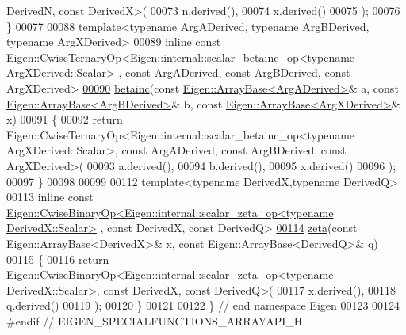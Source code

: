 \begin{DoxyCode}
      DerivedN, \textcolor{keyword}{const} DerivedX>(
00073     n.derived(),
00074     x.derived()
00075   );
00076 \}
00077 
00088 \textcolor{keyword}{template}<\textcolor{keyword}{typename} ArgADerived, \textcolor{keyword}{typename} ArgBDerived, \textcolor{keyword}{typename} ArgXDerived>
00089 \textcolor{keyword}{inline} \textcolor{keyword}{const} 
      \hyperlink{group___core___module_class_eigen_1_1_cwise_ternary_op}{Eigen::CwiseTernaryOp<Eigen::internal::scalar\_betainc\_op<typename ArgXDerived::Scalar>}
      , \textcolor{keyword}{const} ArgADerived, \textcolor{keyword}{const} ArgBDerived, \textcolor{keyword}{const} ArgXDerived>
\hyperlink{namespace_eigen_a81f796c95561b9847eb8a6b8ccfa3e7d}{00090} \hyperlink{namespace_eigen_a726eae91d4e91d8e25cbe55fffa6a92f}{betainc}(\textcolor{keyword}{const} \hyperlink{group___core___module_class_eigen_1_1_array_base}{Eigen::ArrayBase<ArgADerived>}& a, \textcolor{keyword}{const} 
      \hyperlink{group___core___module_class_eigen_1_1_array_base}{Eigen::ArrayBase<ArgBDerived>}& b, \textcolor{keyword}{const} 
      \hyperlink{group___core___module_class_eigen_1_1_array_base}{Eigen::ArrayBase<ArgXDerived>}& x)
00091 \{
00092   \textcolor{keywordflow}{return} Eigen::CwiseTernaryOp<Eigen::internal::scalar\_betainc\_op<typename ArgXDerived::Scalar>, \textcolor{keyword}{const} 
      ArgADerived, \textcolor{keyword}{const} ArgBDerived, \textcolor{keyword}{const} ArgXDerived>(
00093     a.derived(),
00094     b.derived(),
00095     x.derived()
00096   );
00097 \}
00098 
00099 
00112 \textcolor{keyword}{template}<\textcolor{keyword}{typename} DerivedX,\textcolor{keyword}{typename} DerivedQ>
00113 \textcolor{keyword}{inline} \textcolor{keyword}{const} 
      \hyperlink{group___core___module_class_eigen_1_1_cwise_binary_op}{Eigen::CwiseBinaryOp<Eigen::internal::scalar\_zeta\_op<typename DerivedX::Scalar>}
      , \textcolor{keyword}{const} DerivedX, \textcolor{keyword}{const} DerivedQ>
\hyperlink{namespace_eigen_af9555e27540da78d2c4bdd17d3b750b1}{00114} \hyperlink{namespace_eigen_af9555e27540da78d2c4bdd17d3b750b1}{zeta}(\textcolor{keyword}{const} \hyperlink{group___core___module_class_eigen_1_1_array_base}{Eigen::ArrayBase<DerivedX>}& x, \textcolor{keyword}{const} 
      \hyperlink{group___core___module_class_eigen_1_1_array_base}{Eigen::ArrayBase<DerivedQ>}& q)
00115 \{
00116   \textcolor{keywordflow}{return} Eigen::CwiseBinaryOp<Eigen::internal::scalar\_zeta\_op<typename DerivedX::Scalar>, \textcolor{keyword}{const} DerivedX, \textcolor{keyword}{
      const} DerivedQ>(
00117     x.derived(),
00118     q.derived()
00119   );
00120 \}
00121 
00122 \} \textcolor{comment}{// end namespace Eigen}
00123 
00124 \textcolor{preprocessor}{#endif // EIGEN\_SPECIALFUNCTIONS\_ARRAYAPI\_H}
\end{DoxyCode}
